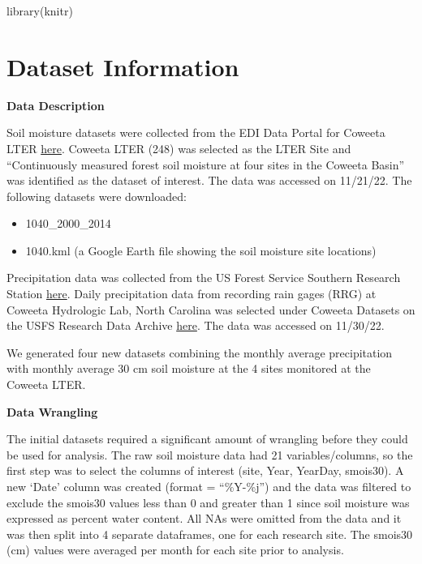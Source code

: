 \documentclass[
  12pt,
]{article}
\newenvironment{Shaded}{\begin{snugshade}}{\end{snugshade}}
\newcommand{\FunctionTok}[1]{\textcolor[rgb]{0.00,0.00,0.00}{#1}}
\newcommand{\NormalTok}[1]{#1}
\providecommand{\tightlist}{%
  \setlength{\itemsep}{0pt}\setlength{\parskip}{0pt}}
\begin{document}
\begin{Shaded}
\begin{Highlighting}[]
\FunctionTok{library}\NormalTok{(knitr)}
\end{Highlighting}
\end{Shaded}

\newpage

\hypertarget{dataset-information}{%
\section{Dataset Information}\label{dataset-information}}

\textbf{Data Description}

Soil moisture datasets were collected from the EDI Data Portal for
Coweeta LTER \href{https://portal.edirepository.org/nis/home.jsp}{here}.
Coweeta LTER (248) was selected as the LTER Site and ``Continuously
measured forest soil moisture at four sites in the Coweeta Basin'' was
identified as the dataset of interest. The data was accessed on
11/21/22. The following datasets were downloaded:

\begin{itemize}
\tightlist
\item
  1040\_2000\_2014
\item
  1040.kml (a Google Earth file showing the soil moisture site
  locations)
\end{itemize}

Precipitation data was collected from the US Forest Service Southern
Research Station
\href{https://www.srs.fs.usda.gov/coweeta/tools-and-data/}{here}. Daily
precipitation data from recording rain gages (RRG) at Coweeta Hydrologic
Lab, North Carolina was selected under Coweeta Datasets on the USFS
Research Data Archive
\href{https://www.fs.usda.gov/rds/archive/Catalog/RDS-2017-0031}{here}.
The data was accessed on 11/30/22.

We generated four new datasets combining the monthly average
precipitation with monthly average 30 cm soil moisture at the 4 sites
monitored at the Coweeta LTER.

\textbf{Data Wrangling}

The initial datasets required a significant amount of wrangling before
they could be used for analysis. The raw soil moisture data had 21
variables/columns, so the first step was to select the columns of
interest (site, Year, YearDay, smois30). A new `Date' column was created
(format = ``\%Y-\%j'') and the data was filtered to exclude the smois30
values less than 0 and greater than 1 since soil moisture was expressed
as percent water content. All NAs were omitted from the data and it was
then split into 4 separate dataframes, one for each research site. The
smois30 (cm) values were averaged per month for each site prior to
analysis.
\end{document}

